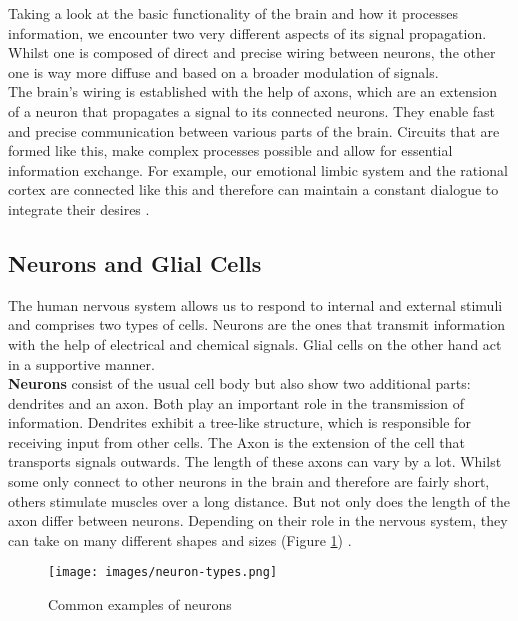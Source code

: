 
    Taking a look at the basic functionality of the brain and how it processes information, we encounter two very different aspects of its signal propagation. Whilst one is composed of direct and precise wiring between neurons, the other one is way more diffuse and based on a broader modulation of signals. \\
    The brain's wiring is established with the help of axons, which are an extension of a neuron that propagates a signal to its connected neurons. They enable fast and precise communication between various parts of the brain. Circuits that are formed like this, make complex processes possible and allow for essential information exchange. For example, our emotional limbic system and the rational cortex are connected like this and therefore can maintain a constant dialogue to integrate their desires \cite{thebrain-SimpleToComplex-neuroFunction-b}.



\subsection{Neurons and Glial Cells}
    The human nervous system allows us to respond to internal and external stimuli and comprises two types of cells. Neurons are the ones that transmit information with the help of electrical and chemical signals. Glial cells on the other hand act in a supportive manner. \\
    \textbf{Neurons} consist of the usual cell body but also show two additional parts: dendrites and an axon. Both play an important role in the transmission of information. Dendrites exhibit a tree-like structure, which is responsible for receiving input from other cells. The Axon is the extension of the cell that transports signals outwards. The length of these axons can vary by a lot. Whilst some only connect to other neurons in the brain and therefore are fairly short, others stimulate muscles over a long distance. But not only does the length of the axon differ between neurons. Depending on their role in the nervous system, they can take on many different shapes and sizes (Figure \ref{fig:neuron-types}) \cite{Banich.2018}.
    
    \begin{figure}[H]
        \centering
        \texttt{[image: images/neuron-types.png]}
        \caption{Common examples of neurons \cite{Banich.2018}}
        \label{fig:neuron-types}
    \end{figure}

